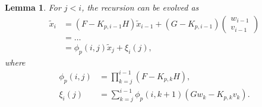 \documentclass[a4 paper]{article}
\numberwithin{equation}{section}
\theoremstyle{boldStyle}
\theoremstyle{boldBlueStyle}
\newtheorem{lemma}{Lemma}[section]
\theoremstyle{boldPurpleStyle}
\theoremstyle{boldRedStyle}
\begin{document}
\begin{lemma}
  For \( j < i \), the recursion can be evolved as
  \begin{align*}
      \tilde{x}_i &= (F - K_{p,i-1}H) \tilde{x}_{i-1} + (G - K_{p,i-1})
      \begin{pmatrix}
          w_{i-1} \\
          v_{i-1}
      \end{pmatrix} \\
      &= \ldots \\
      &= \phi_p(i, j) \tilde{x}_j + \xi_i(j),
  \end{align*}
  where
  \begin{align*}
      \phi_p(i, j) &= \prod_{k=j}^{i-1} (F - K_{p,k}H), \\
      \xi_i(j) &= \sum_{k=j}^{i-1} \phi_p(i, k+1) (G w_k - K_{p,k} v_k).
  \end{align*}
  \end{lemma}  
\end{document}
